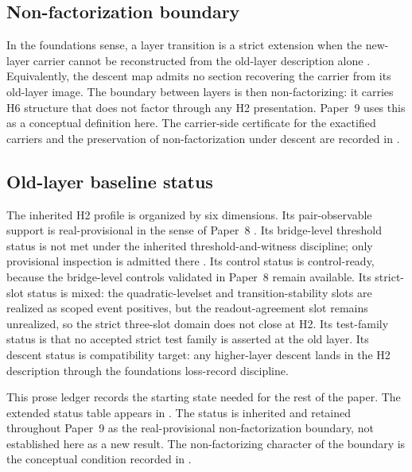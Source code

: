 \documentclass[11pt]{article}
\newcommand{\OldLayer}{H2}
\newcommand{\NewLayer}{H6}
\newcommand{\PaperNine}{Paper~9}
\newcommand{\PaperEight}{Paper~8}
\newcommand{\OldLayerStatus}{real-provisional non-factorization boundary}
\theoremstyle{definition}
\begin{document}
\subsection{Non-factorization boundary}\label{subsec:non-factorization-baseline}

In the foundations sense, a layer transition is a strict extension when the
new-layer carrier cannot be reconstructed from the old-layer description alone
\cite{Tsiokos2026FoundationsII}.  Equivalently, the descent map admits no
section recovering the carrier from its old-layer image.  The boundary between
layers is then non-factorizing: it carries \NewLayer{} structure that does not
factor through any \OldLayer{} presentation.  \PaperNine{} uses this as a
conceptual definition here.  The carrier-side certificate for the exactified
carriers and the preservation of non-factorization under descent are recorded
in
.

\subsection{Old-layer baseline status}\label{subsec:old-layer-status-table}

The inherited \OldLayer{} profile is organized by six dimensions.  Its
pair-observable support is real-provisional in the sense of \PaperEight{}
\cite{Tsiokos2026CarrierToEvent}.  Its bridge-level threshold status is not
met under the inherited threshold-and-witness discipline; only provisional
inspection is admitted there \cite{Tsiokos2026FoundationsII}.  Its control
status is control-ready, because the bridge-level controls validated in
\PaperEight{} remain available.  Its strict-slot status is mixed: the
quadratic-levelset and transition-stability slots are realized as scoped event
positives, but the readout-agreement slot remains unrealized, so the strict
three-slot domain does not close at \OldLayer{}.  Its test-family status is
that no accepted strict test family is asserted at the old layer.  Its descent
status is compatibility target: any higher-layer descent lands in the
\OldLayer{} description through the foundations loss-record discipline.

This prose ledger records the starting state needed for the rest of the paper.
The extended status table appears in .  The status
is inherited and retained throughout \PaperNine{} as the \OldLayerStatus{}, not
established here as a new result.  The non-factorizing character of the boundary
is the conceptual condition recorded in
.
\end{document}
